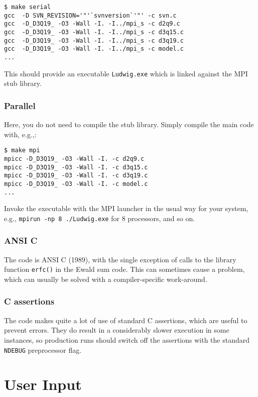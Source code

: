 \begin{verbatim}
$ make serial
gcc  -D SVN_REVISION='"'`svnversion`'"' -c svn.c
gcc  -D_D3Q19_ -O3 -Wall -I. -I../mpi_s -c d2q9.c
gcc  -D_D3Q19_ -O3 -Wall -I. -I../mpi_s -c d3q15.c
gcc  -D_D3Q19_ -O3 -Wall -I. -I../mpi_s -c d3q19.c
gcc  -D_D3Q19_ -O3 -Wall -I. -I../mpi_s -c model.c
...
\end{verbatim}

This should provide an executable \texttt{Ludwig.exe} which is linked
against the MPI stub library.

\subsubsection{Parallel}

Here, you do not need to compile the stub library. Simply compile
the main code with, e.g.,:
\begin{verbatim}
$ make mpi
mpicc -D_D3Q19_ -O3 -Wall -I. -c d2q9.c
mpicc -D_D3Q19_ -O3 -Wall -I. -c d3q15.c
mpicc -D_D3Q19_ -O3 -Wall -I. -c d3q19.c
mpicc -D_D3Q19_ -O3 -Wall -I. -c model.c
...
\end{verbatim}

Invoke the executable with the MPI launcher in the usual way for your
system, e.g., \texttt{mpirun -np 8 ./Ludwig.exe} for 8 processors,
and so on.

\subsubsection{ANSI C}

The code is ANSI C (1989), with the single exception of calls to the
library function \texttt{erfc()} in the Ewald sum code. This
can sometimes cause a problem, which can usually be solved with
a compiler-specific work-around.

\subsubsection{C assertions}

The code makes quite a lot of use of standard C assertions, which
are useful to prevent errors. They do result in a considerably
slower execution in some instances, so production runs should
switch off the assertions with the standard \texttt{NDEBUG}
preprocessor flag.


\section{User Input}


